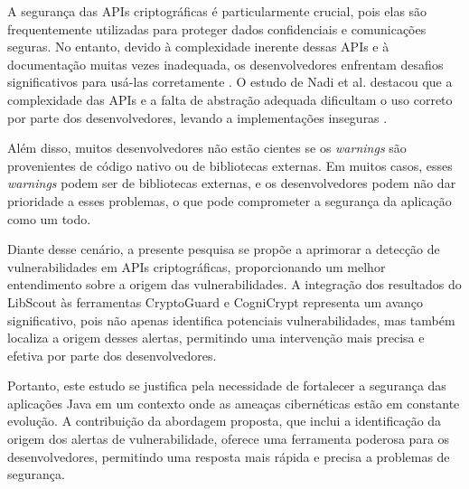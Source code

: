 A segurança das APIs criptográficas é particularmente crucial, pois elas são frequentemente utilizadas para proteger dados confidenciais e comunicações seguras. No entanto, devido à complexidade inerente dessas APIs e à documentação muitas vezes inadequada, os desenvolvedores enfrentam desafios significativos para usá-las corretamente \cite{nadi_icse_2016}. O estudo de Nadi et al. destacou que a complexidade das APIs e a falta de abstração adequada dificultam o uso correto por parte dos desenvolvedores, levando a implementações inseguras \cite{nadi_icse_2016}.

Além disso, muitos desenvolvedores não estão cientes se os \textit{warnings} são provenientes de código nativo ou de bibliotecas externas. Em muitos casos, esses \textit{warnings} podem ser de bibliotecas externas, e os desenvolvedores podem não dar prioridade a esses problemas, o que pode comprometer a segurança da aplicação como um todo.

Diante desse cenário, a presente pesquisa se propõe a aprimorar a detecção de vulnerabilidades em APIs criptográficas, proporcionando um melhor entendimento sobre a origem das vulnerabilidades. A integração dos resultados do LibScout às ferramentas CryptoGuard e CogniCrypt representa um avanço significativo, pois não apenas identifica potenciais vulnerabilidades, mas também localiza a origem desses alertas, permitindo uma intervenção mais precisa e efetiva por parte dos desenvolvedores.

Portanto, este estudo se justifica pela necessidade de fortalecer a segurança das aplicações Java em um contexto onde as ameaças cibernéticas estão em constante evolução. A contribuição da abordagem proposta, que inclui a identificação da origem dos alertas de vulnerabilidade, oferece uma ferramenta poderosa para os desenvolvedores, permitindo uma resposta mais rápida e precisa a problemas de segurança.
